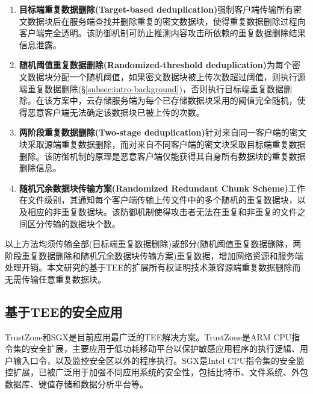 \begin{enumerate}[leftmargin=0em]
    \item \textbf{目标端重复数据删除(Target-based deduplication)}强制客户端传输所有密文数据块后在服务端查找并删除重复的密文数据块，使得重复数据删除过程向客户端完全透明。该防御机制可防止推测内容攻击所依赖的重复数据删除结果信息泄露。
    \item \textbf{随机阈值重复数据删除(Randomized-threshold deduplication)}为每个密文数据块分配一个随机阈值，如果密文数据块被上传次数超过阈值，则执行源端重复数据删除(\S\ref{subsec:intro-background})，否则执行目标端重复数据删除。在该方案中，云存储服务端为每个已存储数据块采用的阈值完全随机，使得恶意客户端无法确定该数据块已被上传的次数。
    \item \textbf{两阶段重复数据删除(Two-stage deduplication)}针对来自同一客户端的密文块采取源端重复数据删除，而对来自不同客户端的密文块采取目标端重复数据删除。该防御机制的原理是恶意客户端仅能获得其自身所有数据块的重复数据删除信息。
    \item \textbf{随机冗余数据块传输方案(Randomized Redundant Chunk Scheme)}工作在文件级别，其通知每个客户端传输上传文件中的多个随机的重复数据块，以及相应的非重复数据块。该防御机制使得攻击者无法在重复和非重复的文件之间区分传输的数据块个数。
\end{enumerate}

以上方法均须传输全部(目标端重复数据删除)或部分(随机阈值重复数据删除，两阶段重复数据删除和随机冗余数据块传输方案)重复数据，增加网络资源和服务端处理开销。本文研究的基于TEE的扩展所有权证明技术兼容源端重复数据删除而无需传输任意重复数据块。

\subsection{基于TEE的安全应用}
\label{subsec:compare-tee}

TrustZone和SGX是目前应用最广泛的TEE解决方案。TrustZone是ARM CPU指令集的安全扩展，主要应用于低功耗移动平台以保护敏感应用程序的执行逻辑、用户输入口令，以及监控安全区以外的程序执行。SGX是Intel CPU指令集的安全监控扩展，已被广泛用于加强不同应用系统的安全性，包括比特币、文件系统、外包数据库、键值存储和数据分析平台等。

